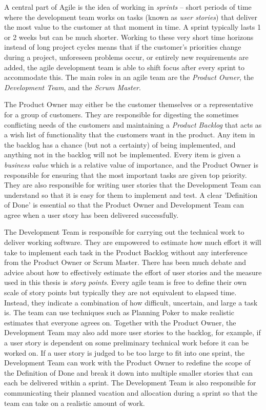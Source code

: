 
A central part of Agile is the idea of working in \emph{sprints} -- short periods of time where the development team works on tasks (known as \emph{user stories}) that deliver the most value to the customer at that moment in time. A sprint typically lasts 1 or 2 weeks but can be much shorter. Working to these very short time horizons instead of long project cycles means that if the customer's priorities change during a project, unforeseen problems occur, or entirely new requirements are added, the agile development team is able to shift focus after every sprint to accommodate this. The main roles in an agile team are the \emph{Product Owner}, the \emph{Development Team}, and the \emph{Scrum Master}.

The Product Owner may either be the customer themselves or a representative for a group of customers. They are responsible for digesting the sometimes conflicting needs of the customers and maintaining a \emph{Product Backlog} that acts as a wish list of functionality that the customers want in the product. Any item in the backlog has a chance (but not a certainty) of being implemented, and anything not in the backlog will not be implemented. Every item is given a \emph{business value} which is a relative value of importance, and the Product Owner is responsible for ensuring that the most important tasks are given top priority. They are also responsible for writing user stories that the Development Team can understand so that it is easy for them to implement and test. A clear 'Definition of Done' is essential so that the Product Owner and Development Team can agree when a user story has been delivered successfully.

The Development Team is responsible for carrying out the technical work to deliver working software. They are empowered to estimate how much effort it will take to implement each task in the Product Backlog without any interference from the Product Owner or Scrum Master. There has been much debate and advice about how to effectively estimate the effort of user stories \citep{cohn2004user} and the measure used in this thesis is \emph{story points}. Every agile team is free to define their own scale of story points but typically they are not equivalent to elapsed time. Instead, they indicate a combination of how difficult, uncertain, and large a task is. The team can use techniques such as Planning Poker \citep{cohn_planning_poker} to make realistic estimates that everyone agrees on. Together with the Product Owner, the Development Team may also add more user stories to the backlog, for example, if a user story is dependent on some preliminary technical work before it can be worked on. If a user story is judged to be too large to fit into one sprint, the Development Team can work with the Product Owner to redefine the scope of the Definition of Done and break it down into multiple smaller stories that can each be delivered within a sprint. The Development Team is also responsible for communicating their planned vacation and allocation during a sprint so that the team can take on a realistic amount of work.

